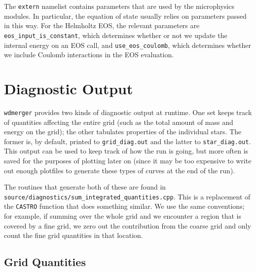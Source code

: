 \documentclass[12pt]{book}
\begin{document}
The \texttt{extern} namelist contains parameters that are used by the microphysics modules. In particular, 
the equation of state usually relies on parameters passed in this way. For the Helmholtz EOS, the relevant 
parameters are \texttt{eos\_input\_is\_constant}, which determines whether or not we update the internal 
energy on an EOS call, and \texttt{use\_eos\_coulomb}, which determines whether we include Coulomb 
interactions in the EOS evaluation.



\section{Diagnostic Output}

\texttt{wdmerger} provides two kinds of diagnostic output at runtime. One set keeps track of quantities affecting 
the entire grid (such as the total amount of mass and energy on the grid); the other tabulates properties 
of the individual stars. The former is, by default, printed to \texttt{grid\_diag.out} and the latter to 
\texttt{star\_diag.out}. This output can be used to keep track of how the run is going, but more often is 
saved for the purposes of plotting later on (since it may be too expensive to write out enough plotfiles to 
generate these types of curves at the end of the run).

The routines that generate both of these are found in \\\texttt{source/diagnostics/sum\_integrated\_quantities.cpp}. 
This is a replacement of the \texttt{CASTRO} function that does something similar. We use the same 
conventions; for example, if summing over the whole grid and we encounter a region that is covered by 
a fine grid, we zero out the contribution from the coarse grid and only count the fine grid quantities 
in that location.

\subsection{Grid Quantities}
\end{document}
